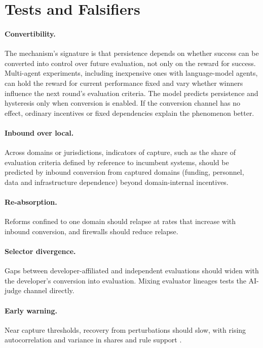 \documentclass[letterpaper]{article} %
\theoremstyle{definition}
\begin{document}
\section{Tests and Falsifiers}\label{sec:tests}

\paragraph{Convertibility.} The mechanism's signature is that persistence depends on whether success can be converted into control over future evaluation, not only on the reward for success. Multi-agent experiments, including inexpensive ones with language-model agents, can hold the reward for current performance fixed and vary whether winners influence the next round's evaluation criteria. The model predicts persistence and hysteresis only when conversion is enabled. If the conversion channel has no effect, ordinary incentives or fixed dependencies explain the phenomenon better.

\paragraph{Inbound over local.} Across domains or jurisdictions, indicators of capture, such as the share of evaluation criteria defined by reference to incumbent systems, should be predicted by inbound conversion from captured domains (funding, personnel, data and infrastructure dependence) beyond domain-internal incentives.

\paragraph{Re-absorption.} Reforms confined to one domain should relapse at rates that increase with inbound conversion, and firewalls should reduce relapse.

\paragraph{Selector divergence.} Gaps between developer-affiliated and independent evaluations should widen with the developer's conversion into evaluation. Mixing evaluator lineages tests the AI-judge channel directly.

\paragraph{Early warning.} Near capture thresholds, recovery from perturbations should slow, with rising autocorrelation and variance in shares and rule support \citep{scheffer2009}.
\end{document}
